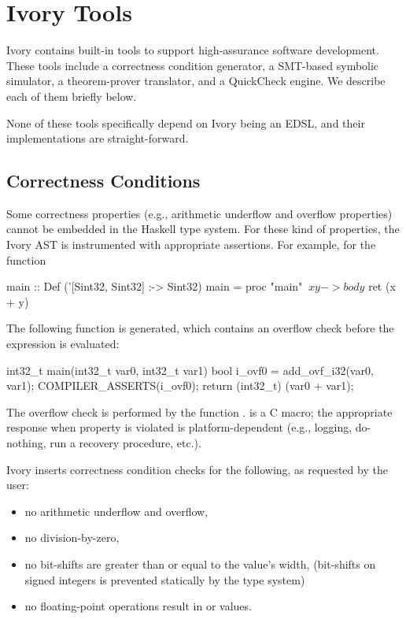 \section{Ivory Tools}
\label{sec:tools}

Ivory contains built-in tools to support high-assurance software
development. These tools include a correctness condition generator, a SMT-based
symbolic simulator, a theorem-prover translator, and a QuickCheck engine. We
describe each of them briefly below.

None of these tools specifically depend on Ivory being an EDSL, and their
implementations are straight-forward.

\subsection{Correctness Conditions}
Some correctness properties (e.g., arithmetic underflow and overflow properties)
cannot be embedded in the Haskell type system. For these kind of properties, the
Ivory AST is instrumented with appropriate assertions. For example, for the
function

\begin{code}
main :: Def ('[Sint32, Sint32] :-> Sint32)
main = proc "main" $ \ x y -> body $
  ret (x + y)
\end{code}
\noindent
The following function is generated, which contains an overflow check before the
expression is evaluated:
\begin{code}
int32_t main(int32_t var0, int32_t var1)
{
    bool i_ovf0 = add_ovf_i32(var0, var1);
    COMPILER_ASSERTS(i_ovf0);
    return (int32_t) (var0 + var1);
}
\end{code}
\noindent
The overflow check is performed by the function
.  is a C macro; the appropriate response when
property is violated is platform-dependent (e.g., logging, do-nothing, run a
recovery procedure, etc.).

Ivory inserts correctness condition checks for the following, as requested by
the user:
\begin{itemize}
\item no arithmetic underflow and overflow,
\item no division-by-zero,
\item no bit-shifts are greater than or equal to the value's width,
  (bit-shifts on signed integers is prevented statically by the type system)
\item no floating-point operations result in  or  values.
\end{itemize}

